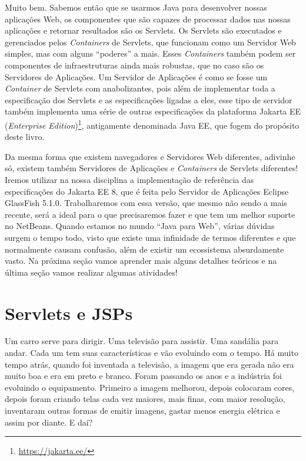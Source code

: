 Muito bem. Sabemos então que se usarmos Java para desenvolver nossas aplicações Web, os componentes que são capazes de processar dados nas nossas aplicações e retornar resultados são os Servlets. Os Servlets são executados e gerenciados pelos \textit{Containers} de Servlets, que funcionam como um Servidor Web simples, mas com alguns ``poderes'' a mais. Esses \textit{Containers} também podem ser componentes de infraestruturas ainda mais robustas, que no caso são os Servidores de Aplicações. Um Servidor de Aplicações é como se fosse um \textit{Container} de Servlets com anabolizantes, pois além de implementar toda a especificação dos Servlets e as especificações ligadas a eles, esse tipo de servidor também implementa uma série de outras especificações da plataforma Jakarta EE (\textit{Enterprise Edition})\footnote{\url{https://jakarta.ee/}}, antigamente denominada Java EE, que fogem do propósito deste livro.

Da mesma forma que existem navegadores e Servidores Web diferentes, adivinhe só, existem também Servidores de Aplicações e \textit{Containers} de Servlets diferentes! Iremos utilizar na nossa disciplina a implementação de referência das especificações do Jakarta EE 8, que é feita pelo Servidor de Aplicações Eclipse GlassFish 5.1.0. Trabalharemos com essa versão, que mesmo não sendo a mais recente, será a ideal para o que precisaremos fazer e que tem um melhor suporte no NetBeans. Quando estamos no mundo ``Java para Web'', várias dúvidas surgem o tempo todo, visto que existe uma infinidade de termos diferentes e que normalmente causam confusão, além de existir um ecossistema absurdamente vasto. Na próxima seção vamos aprender mais alguns detalhes teóricos e na última seção vamos realizar algumas atividades!


\section{Servlets e JSPs}

Um carro serve para dirigir. Uma televisão para assistir. Uma sandália para andar. Cada um tem suas características e vão evoluindo com o tempo. Há muito tempo atrás, quando foi inventada a televisão, a imagem que era gerada não era muito boa e era em preto e branco. Foram passando os anos e a indústria foi evoluindo o equipamento. Primeiro a imagem melhorou, depois colocaram cores, depois foram criando telas cada vez maiores, mais finas, com maior resolução, inventaram outras formas de emitir imagens, gastar menos energia elétrica e assim por diante. E daí?

